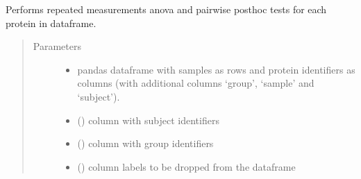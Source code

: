 \documentclass[letterpaper,10pt,english]{sphinxmanual}
\begin{document}
\begin{fulllineitems}
\label{\detokenize{_autosummary/analytics_core.analytics:analytics_core.analytics.analytics.correct_pairwise_ttest}}
\end{fulllineitems}


\begin{fulllineitems}
\label{\detokenize{_autosummary/analytics_core.analytics:analytics_core.analytics.analytics.run_repeated_measurements_anova}}
Performs repeated measurements anova and pairwise posthoc tests for each protein in dataframe.
\begin{quote}\begin{description}
\item[{Parameters}] \leavevmode\begin{itemize}
\item {} 
 \textendash{} pandas dataframe with samples as rows and protein identifiers as columns (with additional columns ‘group’, ‘sample’ and ‘subject’).

\item {} 
 () \textendash{} column with subject identifiers

\item {} 
 () \textendash{} column with group identifiers

\item {} 
 () \textendash{} column labels to be dropped from the dataframe


\end{itemize}
\end{description}
\end{quote}
\end{fulllineitems}
\end{document}
